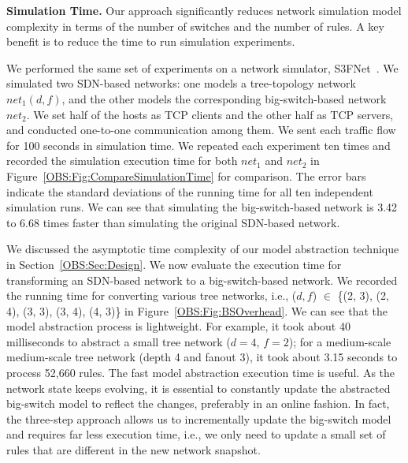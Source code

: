 \textbf{Simulation Time.}
Our approach significantly reduces network simulation model complexity in terms of
the number of switches and the number of rules.
A key benefit is to reduce the time to run simulation experiments.

We performed the same set of experiments on a network simulator, S3FNet~\cite{S3F}.
We simulated two SDN-based networks: one models a tree-topology network $net_1(d, f)$,
and the other models the corresponding big-switch-based network $net_2$.
We set half of the hosts as TCP clients and the other half as TCP servers,
and conducted one-to-one communication among them.
We sent each traffic flow for 100 seconds in simulation time.
We repeated each experiment ten times and recorded the simulation execution time for both $net_1$ and $net_2$ in
Figure~\ref{OBS:Fig:CompareSimulationTime} for comparison.
The error bars indicate the standard deviations of the running time
for all ten independent simulation runs.
We can see that simulating the big-switch-based network is 3.42 to 6.68 times
faster than simulating the original SDN-based network.


We discussed the asymptotic time complexity of our model abstraction technique in 
Section~\ref{OBS:Sec:Design}.
We now evaluate the execution time for transforming an SDN-based network to a big-switch-based network.
We recorded the running time for converting various tree networks,
i.e., ($d, f$) $\in$ \{(2, 3), (2, 4), (3, 3), (3, 4), (4, 3)\} in Figure~\ref{OBS:Fig:BSOverhead}.
We can see that the model abstraction process is lightweight.
For example, it took about 40 milliseconds to abstract a small tree network ($d=4$, $f=2$);
for a medium-scale medium-scale tree network (depth 4 and fanout 3),
it took about 3.15 seconds to process 52,660 rules.
The fast model abstraction execution time is useful.
As the network state keeps evolving, it is essential to constantly update the abstracted big-switch model to reflect the changes, preferably in an online fashion.
In fact, the three-step approach allows us to incrementally update the big-switch model and requires far less execution time, i.e.,
we only need to update a small set of rules that are different in the new network snapshot.

